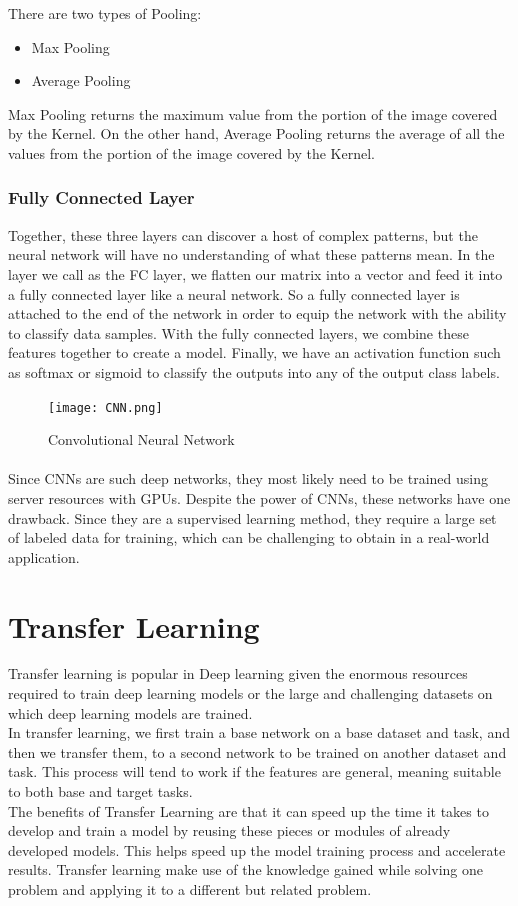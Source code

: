 There are two types of Pooling:
\begin{itemize}
\item{Max Pooling}
\item{Average Pooling}
\end{itemize}


Max Pooling returns the maximum value from the portion of the image covered by the Kernel. On the other hand, Average Pooling returns the average of all the values from the portion of the image covered by the Kernel.


\subsubsection{Fully Connected Layer}
Together, these three layers can discover a host of complex patterns, but the neural network will
have no understanding of what these patterns mean. 
In the layer we call as the FC layer, we flatten our matrix into a vector and feed it into a fully connected layer like a neural network. So a fully connected layer is attached
to the end of the network in order to equip the network with the ability to classify data samples.
With the fully connected layers, we combine these features together to create a model. Finally, we have an activation function such as softmax or sigmoid to classify the outputs into any of the output class labels.
\begin{figure}[h]
	\label{ss}
	\centering
	\texttt{[image: CNN.png]}
	\caption{Convolutional Neural Network}
\end{figure}
\paragraph{}
Since CNNs are such deep networks, they most likely need to be trained using
server resources with GPUs. Despite the power of CNNs, these networks have one drawback. Since they are a supervised
learning method, they require a large set of labeled data for training, which can be
challenging to obtain in a real-world application.

\section{Transfer Learning}
Transfer learning is popular in Deep learning given the enormous resources required to train deep learning models or the large and challenging datasets on which deep learning models are trained.\\
In transfer learning, we first train a base network on a base dataset and task, and then we transfer them, to a second network to be trained on another dataset and task. This process will tend to work if the features are general, meaning suitable to both base and target tasks.\\
The benefits of Transfer Learning are that it can speed up the time it takes to develop
and train a model by reusing these pieces or modules of already developed models. This
helps speed up the model training process and accelerate results.
Transfer learning make use of the knowledge gained while solving one problem and applying it to a different but related problem.
